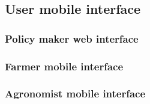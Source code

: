 \subsection{User mobile interface}
\label{sec:user_mobile_interface}



\newpage
\subsubsection{Policy maker web interface}
\label{sec:pm_web_interface}



\newpage
\subsubsection{Farmer mobile interface}
\label{sec:farmer_mob_interface}



\newpage
\subsubsection{Agronomist mobile interface}
\label{sec:agronomist_mob_interface}




